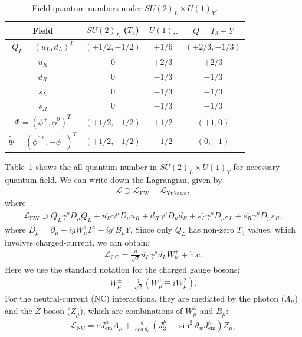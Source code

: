 \answer{}
\begin{table}[ht!]
\centering 
    \begin{tabular}{|c|c|c|c|}
    \hline
    Field & $SU(2)_L$ ($T_3$) & $U(1)_Y$ & $Q = T_3 + Y$ \\
    \hline
    $Q_L = (u_L, d_L)^T$ & $(+1/2, -1/2)$ & $+1/6$ & $(+2/3, -1/3)$ \\
    $u_R$ & $0$ & $+2/3$ & $+2/3$ \\
    $d_R$ & $0$ & $-1/3$ & $-1/3$ \\
    $s_L$ & $0$ & $-1/3$ & $-1/3$ \\ 
    $s_R$ & $0$ & $-1/3$ & $-1/3$ \\
    $\Phi = (\phi^+, \phi^0)^T$ & $(+1/2, -1/2)$ & $+1/2$ & $(+1, 0)$ \\
    $\tilde{\Phi} = (\phi^{0*}, -\phi^-)^T$ & $(+1/2, -1/2)$ & $-1/2$ & $(0, -1)$ \\
    \hline
    \end{tabular}
    \caption{Field quantum numbers under $SU(2)_L \times U(1)_Y$.}
    \label{table:HW5-quantum}
\end{table}
Table~\ref{table:HW5-quantum} shows the all quantum number in $SU(2)_{L}\times U(1)_Y$ for necessary quantum field. We can write down the Lagrangian, given by 
\begin{align}
    \mathcal{L}\supset \mathcal{L}_\text{EW}+\mathcal{L}_\text{Yukawa},
\end{align}
where 
\begin{align}
    \mathcal{L}_\text{EW}\supset \overline{Q_L}\gamma^\mu D_\mu Q_L + \overline{u_R}\gamma^\mu D_\mu u_R + \overline{d_R}\gamma^\mu D_\mu d_R + \overline{s_L}\gamma^\mu D_\mu s_L + \overline{s_R}\gamma^\mu D_\mu s_R,
\end{align}
where $D_\mu=\partial_\mu - igW_\mu^a T^a -ig'B_\mu Y$. Since only $Q_L$ has non-zero $T_3$ values, which involves charged-current, we can obtain: 
\begin{align}
    \mathcal{L}_\text{CC} = \frac{g}{\sqrt{2}} \overline{u_L} \gamma^\mu d_L W^+_\mu + \text{h.c.}
\end{align}
Here we use the standard notation for the charged gauge bosons:
\begin{align}
    W^{\pm}_\mu = \frac{1}{\sqrt{2}}(W^1_\mu \mp i W^2_\mu).
\end{align}
For the neutral-current (NC) interactions, they are mediated by the photon ($A_\mu$) and the $Z$ boson ($Z_\mu$), which are combinations of $W^3_\mu$ and $B_\mu$:
\begin{align}
    \mathcal{L}_\text{NC} = e J^\mu_\text{em} A_\mu + \frac{g}{\cos\theta_w} (J^\mu_3 - \sin^2\theta_w J^\mu_\text{em}) Z_\mu,
\end{align}
